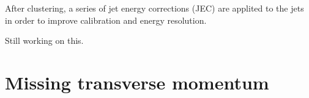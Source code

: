 After clustering, a series of jet energy corrections (JEC) are applited to the jets in order to improve calibration and energy resolution.

Still working on this.
\label{section:jetalgorithm}


\section{Missing transverse momentum}

